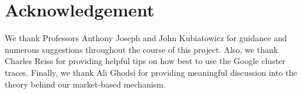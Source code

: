 \documentclass{acm_proc_article-sp}
\begin{document}
\section{Acknowledgement}

We thank Professors Anthony Joseph and John Kubiatowicz for guidance and numerous suggestions throughout the course of this project. Also, we thank Charles Reiss for providing helpful tips on how best to use the Google cluster traces. Finally, we thank Ali Ghodsi for providing meaningful discussion into the theory behind our market-based mechanism.

%

%
%
\end{document}
